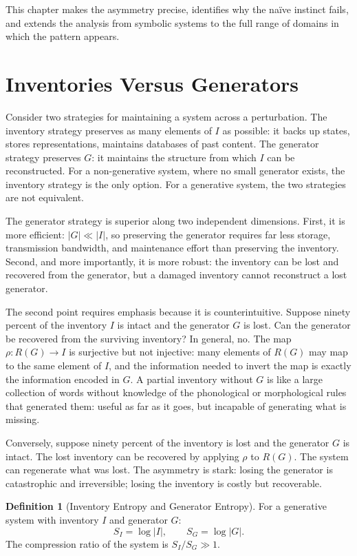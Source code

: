\documentclass[12pt, oneside]{book}
\theoremstyle{flyxion}
\theoremstyle{definition}
\newtheorem{definition}[theorem]{Definition}
\begin{document}
This chapter makes the asymmetry precise, identifies why the naïve
instinct fails, and extends the analysis from symbolic systems to
the full range of domains in which the pattern appears.

\section{Inventories Versus Generators}

Consider two strategies for maintaining a system across a
perturbation. The inventory strategy preserves as many elements
of $I$ as possible: it backs up states, stores representations,
maintains databases of past content. The generator strategy
preserves $G$: it maintains the structure from which $I$ can
be reconstructed. For a non-generative system, where no small
generator exists, the inventory strategy is the only option. For
a generative system, the two strategies are not equivalent.

The generator strategy is superior along two independent dimensions.
First, it is more efficient: $|G| \ll |I|$, so preserving the
generator requires far less storage, transmission bandwidth, and
maintenance effort than preserving the inventory. Second, and more
importantly, it is more robust: the inventory can be lost and
recovered from the generator, but a damaged inventory cannot
reconstruct a lost generator.

The second point requires emphasis because it is counterintuitive.
Suppose ninety percent of the inventory $I$ is intact and the
generator $G$ is lost. Can the generator be recovered from the
surviving inventory? In general, no. The map $\rho : R(G) \to I$
is surjective but not injective: many elements of $R(G)$ may map
to the same element of $I$, and the information needed to invert
the map is exactly the information encoded in $G$. A partial
inventory without $G$ is like a large collection of words without
knowledge of the phonological or morphological rules that generated
them: useful as far as it goes, but incapable of generating what
is missing.

Conversely, suppose ninety percent of the inventory is lost and
the generator $G$ is intact. The lost inventory can be recovered
by applying $\rho$ to $R(G)$. The system can regenerate what was
lost. The asymmetry is stark: losing the generator is catastrophic
and irreversible; losing the inventory is costly but recoverable.

\begin{definition}[Inventory Entropy and Generator Entropy]
For a generative system with inventory $I$ and generator $G$:
\[
S_I = \log|I|, \qquad S_G = \log|G|.
\]
The compression ratio of the system is $S_I / S_G \gg 1$.
\end{definition}
\end{document}
